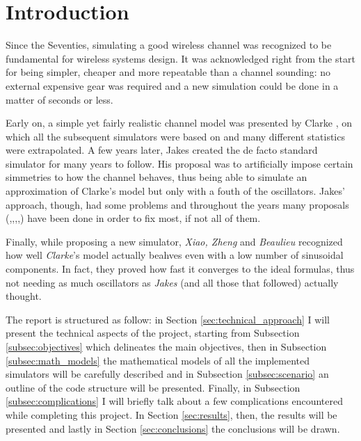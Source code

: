 \section{Introduction} %
\label{sec:introduction}

Since the Seventies, simulating a good wireless channel was recognized to be fundamental for wireless systems design. It was acknowledged right from the start for being simpler, cheaper and more repeatable than a channel sounding: no external expensive gear was required and a new simulation could be done in a matter of seconds or less.

Early on, a simple yet fairly realistic channel model was presented by Clarke \cite{clarke}, on which all the subsequent simulators were based on and many different statistics were extrapolated. A few years later, Jakes created the de facto standard simulator \cite{jakes} for many years to follow. His proposal was to artificially impose certain simmetries to how the channel behaves, thus being able to simulate an approximation of Clarke's model but only with a fouth of the oscillators. Jakes' approach, though, had some problems and throughout the years many proposals (\cite{A1},\cite{A2},\cite{A3},\cite{C1},\cite{C2}) have been done in order to fix most, if not all of them.

Finally, while proposing a new simulator, \textit{Xiao, Zheng} and \textit{Beaulieu} \cite{B1} recognized how well \textit{Clarke}'s model actually beahves even with a low number of sinusoidal components. In fact, they proved how fast it converges to the ideal formulas, thus not needing as much oscillators as \textit{Jakes} (and all those that followed) actually thought.

The report is structured as follow: in Section \ref{sec:technical_approach} I will present the technical aspects of the project, starting from Subsection \ref{subsec:objectives} which delineates the main objectives, then in Subsection \ref{subsec:math_models} the mathematical models of all the implemented simulators will be carefully described and in Subsection \ref{subsec:scenario} an outline of the code structure will be presented. Finally, in Subsection \ref{subsec:complications} I will briefly talk about a few complications encountered while completing this project. In Section \ref{sec:results}, then, the results will be presented and lastly in Section \ref{sec:conclusions} the conclusions will be drawn.